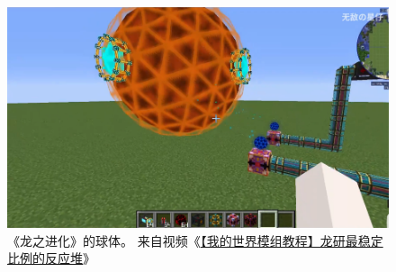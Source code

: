 \documentclass[11pt]{article}
\begin{document}
    \begin{figure}[ht]
        \centering
        \includegraphics[width=\textwidth]{./imgs/Draconic_Evolution_sphere}
        \caption{《龙之进化》的球体。
        来自视频《\href{https://www.bilibili.com/video/BV11541187n8}{【我的世界模组教程】龙研最稳定比例的反应堆}》}
        \label{fig:sphere-de}
    \end{figure}
\end{document}
